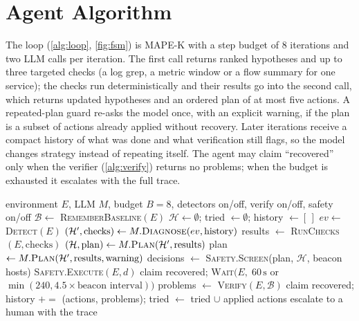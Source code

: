 \documentclass[11pt,a4paper]{article}
\newcommand{\code}[1]{\texttt{#1}}
\begin{document}
\section{Agent Algorithm}
\label{sec:algo}

The loop (\cref{alg:loop}, \cref{fig:fsm}) is MAPE-K with a step budget of 8 iterations and two LLM
calls per iteration. The first call returns ranked hypotheses and up to three targeted checks
(a log grep, a metric window or a flow summary for one service); the checks run deterministically
and their results go into the second call, which returns updated hypotheses and an ordered plan of at
most five actions. A repeated-plan guard re-asks the model once, with an explicit warning, if the
plan is a subset of actions already applied without recovery. Later iterations receive a compact
history of what was done and what verification still flags, so the model changes strategy instead
of repeating itself. The agent may claim ``recovered'' only when the verifier (\cref{alg:verify})
returns no problems; when the budget is exhausted it escalates with the full trace.

\begin{algorithm}[H]
\caption{Sentinel-RX main loop (\code{agent/loop.py::SentinelAgent.run})}
\label{alg:loop}
\begin{algorithmic}[1]
\Require environment $E$, LLM $M$, budget $B=8$, detectors on/off, verify on/off, safety on/off
\State $\mathcal{B} \gets$ \textsc{RememberBaseline}$(E)$ 
\State $\mathcal{H}\gets\emptyset$;\; tried $\gets\emptyset$;\; history $\gets[\,]$
  \State $ev \gets$ \textsc{Detect}$(E)$ 
  \State $(\mathcal{H}', \text{checks}) \gets M.\textsc{Diagnose}(ev, \text{history})$ 
  \State results $\gets$ \textsc{RunChecks}$(E, \text{checks})$ 
  \State $(\mathcal{H}, \text{plan}) \gets M.\textsc{Plan}(\mathcal{H}', \text{results})$ 
   
     \State plan $\gets M.\textsc{Plan}(\mathcal{H}', \text{results}, \text{warning})$
  \EndIf
  \State decisions $\gets$ \textsc{Safety.Screen}(plan, $\mathcal{H}$, beacon hosts) 
   \State \textsc{Safety.Execute}$(E, d)$  \EndFor
   \State claim recovered; \Return \EndIf
  \State \textsc{Wait}$(E,\; 60\,\mathrm{s}$ or $\min(240, 4.5\times\text{beacon interval}))$
  \State problems $\gets$ \textsc{Verify}$(E, \mathcal{B})$ 
   \State claim recovered; \Return \EndIf
  \State history $\mathrel{+}=$ (actions, problems);\; tried $\gets$ tried $\cup$ applied actions
\EndFor
\State escalate to a human with the trace
\end{algorithmic}
\end{algorithm}
\end{document}
